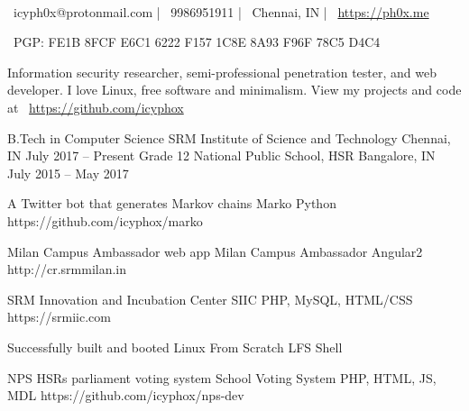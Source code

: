 \documentclass[]{awesome-cv}
\begin{document}
    
\begin{center}
	  \\
	\vspace{2mm}
	{\faEnvelope\ icyph0x@protonmail.com} | {\faMobile\ 9986951911} | {\faMapMarker\ Chennai, IN} | {\faLink\ \url{https://ph0x.me}}
	\begin{center}
		{\faKey\ PGP: FE1B 8FCF E6C1 6222 F157 1C8E 8A93 F96F 78C5 D4C4}
	\end{center}
\end{center}
	\begin{multicols}{2}
\begin{center}
	Information security researcher, semi-professional penetration tester, and web developer. I love Linux, free software and minimalism. View my projects and code at
	{\faGithub\ \url{https://github.com/icyphox}}
\end{center}
\begin{cventries}
	\cventry
	{B.Tech in Computer Science}
	{SRM Institute of Science and Technology}
	{Chennai, IN}
	{July 2017 – Present}
	{}
	\cventry
	{Grade 12}
	{National Public School, HSR}
	{Bangalore, IN}
	{July 2015 – May 2017}
	{}
\end{cventries}

\vspace{-2mm}
\begin{cventries}
	\cventry
	{A Twitter bot that generates Markov chains}
	{Marko}
	{Python}
	{https://github.com/icyphox/marko}
	{}
	
	\vspace{-5mm}
	\cventry
	{Milan Campus Ambassador web app}
	{Milan Campus Ambassador}
	{Angular2}
	{http://cr.srmmilan.in}
	{}
	
	\vspace{-5mm}
	\cventry
	{SRM Innovation and Incubation Center}
	{SIIC}
	{PHP, MySQL, HTML/CSS}
	{https://srmiic.com}
	{}
	
	\vspace{-5mm}
	\cventry
	{Successfully built and booted Linux From Scratch}
	{LFS}
	{Shell}
	{}
	{}
	
	\vspace{-5mm}
	\cventry
	{NPS HSR\textquotesingle{}s parliament voting system}
	{School Voting System}
	{PHP, HTML, JS, MDL}
	{https://github.com/icyphox/nps-dev}
	{}
	

\end{cventries}
\end{multicols}
\end{document}
